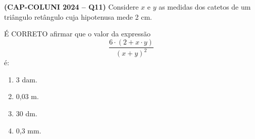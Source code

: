\textbf{(CAP-COLUNI 2024 -- Q11)} Considere $x$ e $y$ as medidas dos catetos de um triângulo retângulo cuja hipotenusa mede 2 cm.

É CORRETO afirmar que o valor da expressão
\[
\frac{6\cdot(2+x\cdot y)}{(x+y)^2}
\]
é:

\begin{enumerate}
	\item 3 dam.
	\item 0,03 m.
	\item 30 dm.
	\item 0,3 mm.
\end{enumerate}
